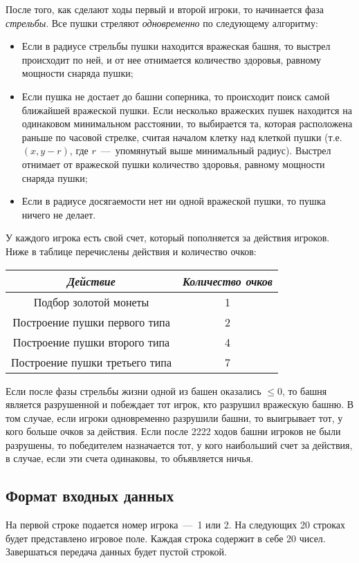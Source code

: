 После того, как сделают ходы первый и второй игроки, то начинается фаза \emph{стрельбы}. Все пушки стреляют \emph{одновременно} по следующему алгоритму:
\begin{itemize}
    \item Если в радиусе стрельбы пушки находится вражеская башня, то выстрел происходит по ней, и от нее отнимается количество здоровья, равному мощности снаряда пушки;
    \item Если пушка не достает до башни соперника, то происходит поиск самой ближайшей вражеской пушки. Если несколько вражеских пушек находится на одинаковом минимальном расстоянии, то выбирается та, которая расположена раньше по часовой стрелке, считая началом клетку над клеткой пушки (т.е. $(x, y - r)$, где $r$~---~упомянутый выше минимальный радиус). Выстрел отнимает от вражеской пушки количество здоровья, равному мощности снаряда пушки;
    \item Если в радиусе досягаемости нет ни одной вражеской пушки, то пушка ничего не делает.
\end{itemize} 

У каждого игрока есть свой счет, который пополняется за действия игроков. Ниже в таблице перечислены действия и количество очков:
\begin{table}[h]
    \centering
    \begin{tabular}{|c|c|}
        \hline
        \emph{Действие} & \emph{Количество очков} \\
        \hline
        Подбор золотой монеты & 1 \\
        \hline
        Построение пушки первого типа & 2 \\
        \hline
        Построение пушки второго типа & 4 \\
        \hline
        Построение пушки третьего типа & 7 \\
        \hline
    \end{tabular}
\end{table}

Если после фазы стрельбы жизни одной из башен оказались $\leq 0$, то башня является разрушенной и побеждает тот игрок, кто разрушил вражескую башню. В том случае, если игроки одновременно разрушили башни, то выигрывает тот, у кого больше очков за действия. Если после 2222 ходов башни игроков не были разрушены, то победителем назначается тот, у кого наибольший счет за действия, в случае, если эти счета одинаковы, то объявляется ничья. 

\subsection*{Формат входных данных}
На первой строке подается номер игрока~---~1 или 2.
На следующих 20 строках будет представлено игровое поле. Каждая строка содержит в себе 20 чисел. Завершаться передача данных будет пустой строкой.

